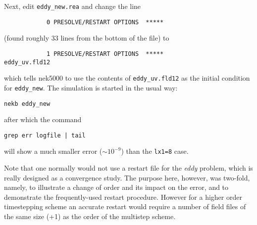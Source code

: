 Next, edit {\tt eddy\_new.rea} and change the line 
\begin{verbatim}
            0 PRESOLVE/RESTART OPTIONS  *****
\end{verbatim}
(found roughly 33 lines from the bottom of the file) to
\begin{verbatim}
            1 PRESOLVE/RESTART OPTIONS  *****
eddy_uv.fld12
\end{verbatim}
which tells nek5000 to use the contents of {\tt eddy\_uv.fld12}
as the initial condition for {\tt eddy\_new}.
The simulation is started in the usual way:
\begin{verbatim}
nekb eddy_new
\end{verbatim}
after which the command
\begin{verbatim}
grep err logfile | tail
\end{verbatim}
will show a much smaller error ($\sim 10^{-9}$) than the {\tt lx1=8}
case. 

Note that one normally would not use a restart file for the {\em eddy}
problem, which is really designed as a convergence study.  The purpose here, however, was two-fold, namely,
to illustrate a change of order and its impact on the error, and to
demonstrate the frequently-used restart procedure. However for a higher order timestepping scheme an accurate restart would require a number of field files of the same size (+1) as the order of the multistep scheme.
